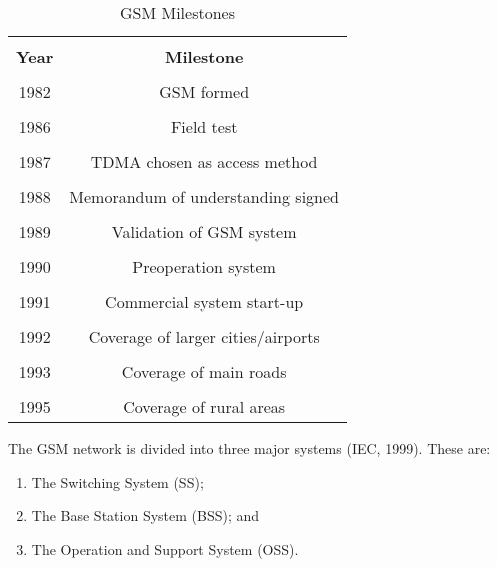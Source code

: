 \documentclass[12pt,svgnames,smaller]{article} %
\begin{document}
	\begin{table}[ht]
		
		\centering 
		
		\caption{GSM Milestones}
		
		\begin{tabular}{|c|c|}
			
			\hline & \\ [0.5ex] 
			\textbf{Year} & \textbf{Milestone}  \\ 
			\hline
			& \\ [0.5ex] 
			1982 & GSM formed \\
			& \\ [0.5ex] 
			1986 & Field test \\ 
			& \\ [0.5ex] 
			1987 & TDMA chosen as access method \\
			& \\ [0.5ex] 
			1988 & Memorandum of understanding signed \\
			& \\ [0.5ex] 
			1989 & Validation of GSM system \\
			& \\ [0.5ex] 
			1990 & Preoperation system \\
			& \\ [0.5ex] 
			1991 & Commercial system start-up \\
			& \\ [0.5ex] 
			1992 & Coverage of larger cities/airports \\
			& \\ [0.5ex] 
			1993 & Coverage of main roads \\
			& \\ [0.5ex] 
			1995 & Coverage of rural areas \\
			\hline 
			
		\end{tabular} 	
		
		\label{table:GSM_Milestones}
		
	\end{table}
	
	The GSM network is divided into three major systems (IEC, 1999). These are:
	
	\begin{enumerate}
		\item The Switching System (SS);
		\item The Base Station System (BSS); and
		\item The Operation and Support System (OSS).
	\end{enumerate}
	
\end{document}

